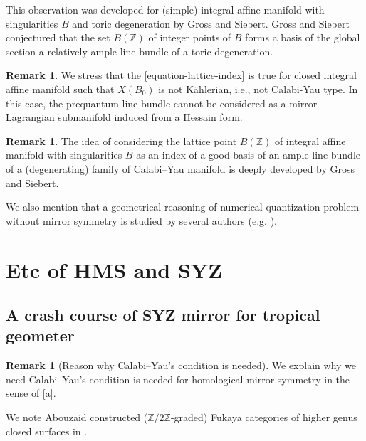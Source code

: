 \documentclass[a4paper,dvipdfmx,reqno,12pt]{amsart}
\theoremstyle{definition}
\newtheorem{remark}[theorem]{Remark}
\newcommand{\Z}{\mathbb{Z}}%
\numberwithin{equation}{section}
\begin{document}
This observation was developed for 
(simple) integral affine manifold with singularities
$B$
and toric degeneration by Gross and Siebert. 
Gross and Siebert conjectured 
that the set $B(\mathbb{Z})$ of integer points of 
$B$ forms a basis of the global section a 
relatively ample line bundle of a toric degeneration.


\begin{remark}
We stress that the \cref{equation-lattice-index} is 
true for closed integral affine manifold 
such that $X(B_0)$ is not K\"ahlerian, i.e., 
not Calabi-Yau type.
In this case,
the prequantum line bundle cannot be considered as
a mirror Lagrangian submanifold induced from a Hessain
form.
\end{remark}



\begin{remark}

The idea of considering the lattice point 
$B(\mathbb{Z})$ of 
integral affine manifold with singularities $B$ as 
an index of a good basis of an ample line bundle of 
a (degenerating) family of Calabi--Yau manifold is 
deeply developed by Gross and Siebert. 




We also mention that a geometrical reasoning 
of numerical quantization problem without
mirror symmetry is studied by several authors (e.g. \cite{MR2879247,
https://doi.org/10.48550/arxiv.1904.04076}).
\end{remark}



\section{Etc of HMS and SYZ}

\subsection{A crash course of SYZ mirror for tropical 
geometer}

\begin{remark}[{Reason why Calabi--Yau's condition is needed}]

We explain why we need Calabi--Yau's condition is needed for
homological mirror symmetry in the sense of \cref{a}.

We note Abouzaid constructed ($\Z/2\Z$-graded)
Fukaya categories of higher genus closed surfaces in
\cite{MR2383898}. 
\end{remark}
\end{document}
